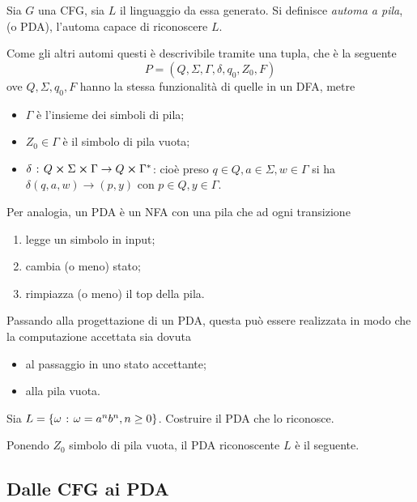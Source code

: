 \documentclass{subfiles}
\begin{document}
\begin{Definition*}
    Sia \(G\) una CFG, sia \(L\) il linguaggio da essa generato. Si definisce \emph{automa a pila}, (o PDA),  l'automa capace di riconoscere \(L\).

    \noindent Come gli altri automi questi è descrivibile tramite una tupla, che è la seguente
    \[
        P = (Q, \Sigma, \Gamma, \delta, q_{0}, Z_{0}, F)
    \]
    ove \(Q, \Sigma, q_{0}, F\) hanno la stessa funzionalità di quelle in un DFA, metre
    \begin{itemize}
        \item \(\Gamma\) è l'insieme dei simboli di pila;
        \item \(Z_{0} \in \Gamma\) è il simbolo di pila vuota;
        \item \(\delta \such Q \cp \Sigma \cp \Gamma \to Q \cp \Gamma^{*}\): cioè preso \(q \in Q, a \in \Sigma, w \in \Gamma\) si ha \(\delta(q, a, w) \to (p, y)\) con \(p \in Q, y \in \Gamma\).
    \end{itemize}
\end{Definition*}

\noindent Per analogia, un PDA è un NFA con una pila che ad ogni transizione
\begin{enumerate}
    \item legge un simbolo in input;
    \item cambia (o meno) stato;
    \item rimpiazza (o meno) il top della pila.
\end{enumerate}

\noindent Passando alla progettazione di un PDA, questa può essere realizzata in modo che la computazione accettata sia dovuta
\begin{itemize}
    \item al passaggio in uno stato accettante;
    \item alla pila vuota.
\end{itemize}

\begin{Example*}
    Sia \(L = \left\{\omega \operatorname{\: {:} \:} \omega = a^{n}b^{n}, n \ge 0\right\}\). Costruire il PDA che lo riconosce.
    \begin{Solution*}
        Ponendo \(Z_{0}\) simbolo di pila vuota, il PDA riconoscente \(L\) è il seguente.
        
    \end{Solution*}
\end{Example*}
\clearpage

\subsection{Dalle CFG ai PDA}

\end{document}
